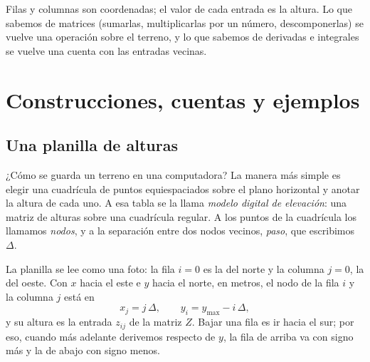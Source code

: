 \begin{idea}
Filas y columnas son coordenadas; el valor de cada entrada es la altura. Lo que sabemos de
matrices (sumarlas, multiplicarlas por un número, descomponerlas) se vuelve una operación
sobre el terreno, y lo que sabemos de derivadas e integrales se vuelve una cuenta con las
entradas vecinas.
\end{idea}

\section{Construcciones, cuentas y ejemplos}

\subsection{Una planilla de alturas}\label{sec:terreno-planilla}

¿Cómo se guarda un terreno en una computadora? La manera más simple es elegir una cuadrícula
de puntos equiespaciados sobre el plano horizontal y anotar la altura de cada uno. A esa tabla
se la llama \emph{modelo digital de elevación}: una matriz de alturas sobre una cuadrícula
regular. A los puntos de la cuadrícula los llamamos \emph{nodos}, y a la separación entre dos
nodos vecinos, \emph{paso}, que escribimos \(\Delta\).

La planilla se lee como una foto: la fila \(i=0\) es la del norte y la columna \(j=0\), la del
oeste. Con \(x\) hacia el este e \(y\) hacia el norte, en metros, el nodo de la fila \(i\) y la columna \(j\) está en
\[
  x_j=j\,\Delta,\qquad y_i=y_{\max}-i\,\Delta ,
\]
y su altura es la entrada \(z_{ij}\) de la matriz \(Z\). Bajar una fila es ir hacia el sur; por
eso, cuando más adelante derivemos respecto de \(y\), la fila de arriba va con signo más y la de
abajo con signo menos.

